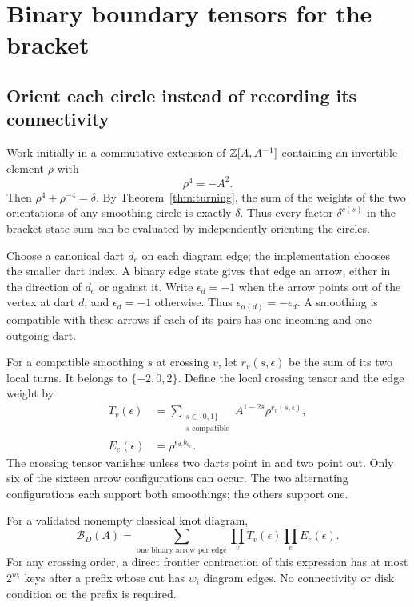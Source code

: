 \section{Binary boundary tensors for the bracket}
\label{sec:tensors}

\subsection{Orient each circle instead of recording its connectivity}

Work initially in a commutative extension of
$\mathbb Z[A,A^{-1}]$ containing an invertible element $\rho$ with
\begin{equation}\label{eq:rho-fourth}
 \rho^4=-A^2.
\end{equation}
Then $\rho^4+\rho^{-4}=\delta$. By Theorem~\ref{thm:turning}, the sum of the
weights of the two orientations of any smoothing circle is exactly
$\delta$. Thus every factor $\delta^{c(s)}$ in the bracket state sum can
be evaluated by independently orienting the circles.

Choose a canonical dart $d_e$ on each diagram edge; the implementation
chooses the smaller dart index. A binary edge state gives that edge an
arrow, either in the direction of $d_e$ or against it. Write
$\epsilon_d=+1$ when the arrow points out of the vertex at dart $d$, and
$\epsilon_d=-1$ otherwise. Thus $\epsilon_{\alpha(d)}=-\epsilon_d$.
A smoothing is compatible with these arrows if each of its pairs has one
incoming and one outgoing dart.

For a compatible smoothing $s$ at crossing $v$, let $r_v(s,\epsilon)$ be
the sum of its two local turns. It belongs to $\{-2,0,2\}$. Define the
local crossing tensor and the edge weight by
\begin{align}
 T_v(\epsilon)&=\sum_{\substack{s\in\{0,1\}\\s\text{ compatible}}}
          A^{1-2s}\rho^{r_v(s,\epsilon)},\label{eq:crossing-tensor}\\
 E_e(\epsilon)&=\rho^{\epsilon_{d_e}b_{d_e}}.\label{eq:edge-tensor}
\end{align}
The crossing tensor vanishes unless two darts point in and two point out.
Only six of the sixteen arrow configurations can occur. The two alternating
configurations each support both smoothings; the others support one.

\begin{theorem}
\label{thm:binary-tensor}
For a validated nonempty classical knot diagram,
\begin{equation}\label{eq:network}
 \mathcal B_D(A)=
 \sum_{\text{one binary arrow per edge}}
     \prod_v T_v(\epsilon)\prod_e E_e(\epsilon).
\end{equation}
For any crossing order, a direct frontier contraction of this expression
has at most $2^{w_i}$ keys after a prefix whose cut has $w_i$ diagram edges.
No connectivity or disk condition on the prefix is required.
\end{theorem}

